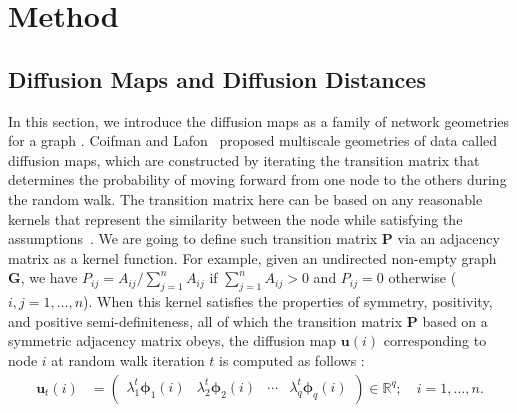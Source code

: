 \documentclass[11pt]{article}
\theoremstyle{definition}
\begin{document}
\section{Method}
\label{sec:method}
\subsection{Diffusion Maps and Diffusion Distances}
\label{ssec:method2}

In this section, we introduce the diffusion maps as a family of network geometries for a graph \cite{coifman2006diffusion}. Coifman and Lafon~\cite{coifman2006diffusion,lafon2006diffusion} proposed multiscale geometries of data called diffusion maps, which are constructed by iterating the transition matrix that determines the probability of moving forward from one node to the others during the random walk. The transition matrix here can be based on any reasonable kernels that represent the similarity between the node while satisfying the assumptions~\cite{coifman2006diffusion, coifman2005geometric}. We are going to define such transition matrix $\mathbf{P}$ via an adjacency matrix as a kernel function. For example, given an undirected non-empty graph $\mathbf{G}$, we have $P_{ij} = A_{ij} / \sum\limits_{j=1}^{n} A_{ij}$ if $\sum\limits_{j=1}^{n} A_{ij} > 0$ and $P_{ij} = 0$ otherwise ($i,j=1,\ldots,n$). When this kernel satisfies the properties of symmetry, positivity, and positive semi-definiteness, all of which the transition matrix $\mathbf{P}$ based on a symmetric adjacency matrix obeys, the diffusion map $\mathbf{u}(i)$ corresponding to node $i$ at random walk iteration $t$ is computed as follows : 
\begin{align}
\label{eq:U}
\mathbf{u}_{t}(i)  &= \begin{pmatrix} \lambda^{t}_{1} \mathbf{\phi}_{1}(i) & \lambda^{t}_{2} \mathbf{\phi}_{2} (i)  & \cdots & \lambda^{t}_{q} \mathbf{\phi}_{q}(i) \end{pmatrix} \in \mathbb{R}^{q}; \quad i = 1, \ldots, n.
\end{align}
\end{document}
